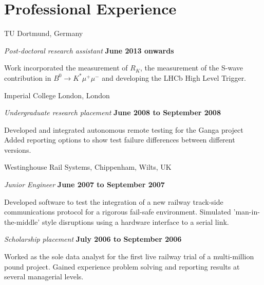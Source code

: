 \documentclass[10pt]{article}
\renewenvironment{compactitem}{
  \begin{list}{}{
    \setlength{\leftmargin}{1.5em}
  }
}{
  \end{list}
}
\begin{document}
\section*{Professional Experience}
TU Dortmund, Germany
\begin{compactitem}
\item \textit{Post-doctoral research assistant}%
        \hfill \textbf{June 2013 onwards}
\begin{compactitem}
\item Work incorporated the measurement of $R_K$, the measurement of the S-wave contribution in 
$B^0 \rightarrow K^{*}\mu^{+}\mu^{-}$ and developing the LHCb High Level Trigger.
\end{compactitem}
\end{compactitem}

Imperial College London, London
\begin{compactitem}
\item \textit{Undergraduate research placement}%
        \hfill \textbf{June 2008 to September 2008}
\begin{compactitem}
\item Developed and integrated autonomous remote testing for the Ganga project  
Added reporting options to show test failure differences between different versions.
\end{compactitem}
\end{compactitem}

Westinghouse Rail Systems, Chippenham, Wilts, UK
\begin{compactitem}
\item \textit{Junior Engineer}%
        \hfill \textbf{June 2007 to September 2007}
\begin{compactitem}
\item Developed software to test the integration of a new railway track-side communications protocol for a rigorous fail-safe environment.
 Simulated 'man-in-the-middle' style disruptions using a hardware interface to a serial link.
\end{compactitem}
\item \textit{Scholarship placement}%
        \hfill \textbf{July 2006 to September 2006}
\begin{compactitem}
\item Worked as the sole data analyst for the first live railway trial of a multi-million pound project. 
Gained experience problem solving and reporting results at several managerial levels. 
\end{compactitem}
\end{compactitem}
\end{document}
